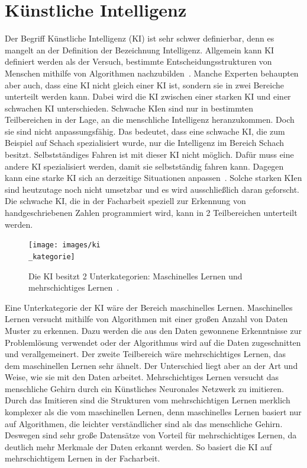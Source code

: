 \documentclass[11pt]{article}
\begin{document}
\section{Künstliche Intelligenz}
Der Begriff Künstliche Intelligenz (KI) ist sehr schwer definierbar, denn es mangelt an der Definition der Bezeichnung Intelligenz.
Allgemein kann KI definiert werden als der Versuch, bestimmte Entscheidungsstrukturen von Menschen mithilfe von
Algorithmen nachzubilden~\cite{4}. Manche Experten behaupten aber auch, dass eine KI nicht gleich einer KI ist, sondern sie in zwei Bereiche unterteilt werden kann.
Dabei wird die KI zwischen einer starken KI und einer schwachen KI unterschieden. Schwache KIen sind nur in bestimmten Teilbereichen in der Lage,
an die menschliche Intelligenz heranzukommen. Doch sie sind nicht anpassungsfähig. Das bedeutet, dass eine schwache KI, die zum Beispiel auf Schach
spezialisiert wurde, nur die Intelligenz im Bereich Schach besitzt. Selbstständiges Fahren ist mit dieser KI nicht möglich. Dafür muss eine
andere KI spezialisiert werden, damit sie selbstständig fahren kann. Dagegen kann eine starke KI sich an derzeitige Situationen anpassen~\cite{2}.
Solche starken KIen sind heutzutage noch nicht umsetzbar und es wird ausschließlich daran geforscht.
Die schwache KI, die in der Facharbeit speziell zur Erkennung von handgeschriebenen Zahlen programmiert wird, kann in 2 Teilbereichen
unterteilt werden.
\begin{figure}[h]
    \centering
    \texttt{[image: images/ki\\\_kategorie]}
    \caption[Unterkategorien der Künstliche Intelligenz~\cite{4}]{Die KI besitzt 2 Unterkategorien: Maschinelles Lernen und mehrschichtiges Lernen~\cite{4}.}
\end{figure}
Eine Unterkategorie der KI wäre der Bereich maschinelles Lernen. Maschinelles Lernen versucht mithilfe von Algorithmen mit einer großen Anzahl von
Daten Muster zu erkennen. Dazu werden die aus den Daten gewonnene Erkenntnisse zur Problemlösung verwendet oder der Algorithmus wird auf
die Daten zugeschnitten und verallgemeinert.
Der zweite Teilbereich wäre mehrschichtiges Lernen, das dem maschinellen Lernen sehr ähnelt. Der Unterschied liegt aber an der Art und Weise, wie
sie mit den Daten arbeitet. Mehrschichtiges Lernen versucht das menschliche Gehirn durch ein Künstliches Neuronales Netzwerk zu imitieren.
Durch das Imitieren sind die Strukturen vom mehrschichtigen Lernen merklich komplexer als die vom maschinellen Lernen, denn
maschinelles Lernen basiert nur auf Algorithmen, die leichter verständlicher sind als das menschliche Gehirn. Deswegen sind
sehr große Datensätze von Vorteil für mehrschichtiges Lernen, da deutlich mehr Merkmale der Daten erkannt werden. So basiert die KI auf
mehrschichtigem Lernen in der Facharbeit.
\end{document}
